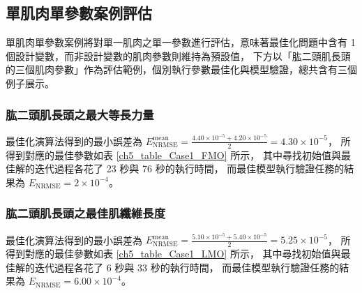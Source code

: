 \subsection{單肌肉單參數案例評估}
單肌肉單參數案例將對單一肌肉之單一參數進行評估，意味著最佳化問題中含有 1 個設計變數，而非設計變數的肌肉參數則維持為預設值，
下方以「肱二頭肌長頭的三個肌肉參數」作為評估範例，個別執行參數最佳化與模型驗證，總共含有三個例子展示。

\subsubsection{肱二頭肌長頭之最大等長力量}
最佳化演算法得到的最小誤差為 $E^\mathrm{mean}_\mathrm{NRMSE} = \frac{4.40 \times 10^{-5} + 4.20 \times 10^{-5}}{2} = 4.30 \times 10^{-5}$，
所得到對應的最佳參數如表 \ref{ch5_table_Case1_FMO} 所示，
其中尋找初始值與最佳解的迭代過程各花了 23 秒與 76 秒的執行時間，
而最佳模型執行驗證任務的結果為 $E_\mathrm{NRMSE} = 2 \times 10^{-4}$。

\begin{table}[!ht]
    \caption[單肌肉單參數案例：肱二頭肌長頭之最大等長力量的最佳參數]{單肌肉單參數案例於肱二頭肌長頭之最大等長力量的最佳參數}
	\label{ch5_table_Case1_FMO}
	\centering
\end{table}

\clearpage

\subsubsection{肱二頭肌長頭之最佳肌纖維長度}
最佳化演算法得到的最小誤差為 $E^\mathrm{mean}_\mathrm{NRMSE} = \frac{5.10 \times 10^{-5} + 5.40 \times 10^{-5}}{2} = 5.25 \times 10^{-5}$，
所得到對應的最佳參數如表 \ref{ch5_table_Case1_LMO} 所示，
其中尋找初始值與最佳解的迭代過程各花了 6 秒與 33 秒的執行時間，
而最佳模型執行驗證任務的結果為 $E_\mathrm{NRMSE} = 6.00 \times 10^{-4}$。

\begin{table}[!ht]
    \caption[單肌肉單參數案例：肱二頭肌長頭之最佳肌纖維長度的最佳參數]{單肌肉單參數案例於肱二頭肌長頭之最佳肌纖維長度的最佳參數}
	\label{ch5_table_Case1_LMO}
	\centering
\end{table}

